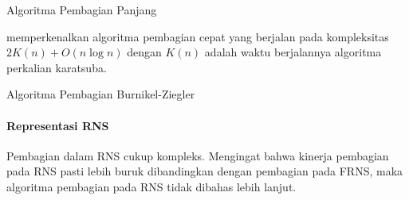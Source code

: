 \begin{algorithm}
  \caption{Algoritma Pembagian Panjang}
  \label{alg:long_div}
  \begin{algorithmic}[1]
    \Statex
      \Else
      \EndIf
        \EndWhile
        \State {}
      \EndFor
    \EndFunction
  \end{algorithmic}

\end{algorithm}

\citet{div_burnikel_ziegler} memperkenalkan algoritma pembagian cepat yang berjalan pada kompleksitas $2K(n)+O(n \log n)$ dengan $K(n)$ adalah waktu berjalannya algoritma perkalian karatsuba.

\begin{algorithm}
  \caption{Algoritma Pembagian Burnikel-Ziegler}
  \label{alg:div_burnikel_ziegler}
  \begin{algorithmic}
    \Statex

    \EndFunction
  \end{algorithmic}
\end{algorithm}

\paragraph{Representasi RNS}

Pembagian dalam RNS cukup kompleks. Mengingat bahwa kinerja pembagian pada RNS pasti lebih buruk dibandingkan dengan pembagian pada FRNS, maka algoritma pembagian pada RNS tidak dibahas lebih lanjut. 
